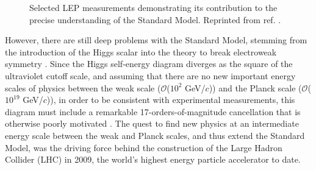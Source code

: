 \documentclass[dissertation.tex]{subfiles}
\begin{document}
\begin{figure}
	\caption{Selected LEP measurements demonstrating its contribution to the precise understanding of the Standard Model.  Reprinted from ref. \cite{Drees}.}
	\label{fig:LEP}
\end{figure}

However, there are still deep problems with the Standard Model, stemming from the introduction of the Higgs scalar into the theory to break electroweak symmetry \cite{Higgs1964132,PhysRevLett.13.508,PhysRev.145.1156}.  Since the Higgs self-energy diagram diverges as the square of the ultraviolet cutoff scale, and assuming that there are no new important energy scales of physics between the weak scale ($\mathcal{O}$($10^{2}$ GeV/$c$)) and the Planck scale ($\mathcal{O}$($10^{19}$ GeV/$c$)), in order to be consistent with experimental measurements, this diagram must include a remarkable 17-orders-of-magnitude cancellation that is otherwise poorly motivated \cite{Aitchison:1111394}.  The quest to find new physics at an intermediate energy scale between the weak and Planck scales, and thus extend the Standard Model, was the driving force behind the construction of the Large Hadron Collider (LHC) in 2009, the world's highest energy particle accelerator to date.
\end{document}

